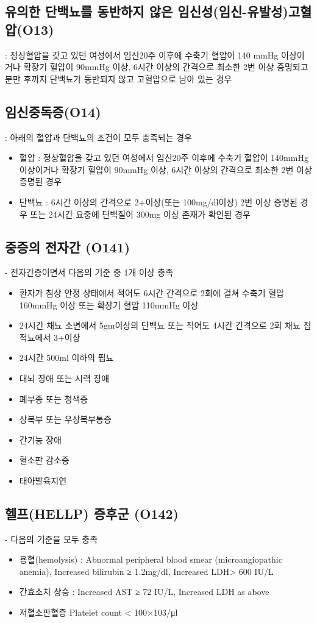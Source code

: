 \subsection{유의한 단백뇨를 동반하지 않은 임신성(임신-유발성)고혈압(O13)}\label{SUPPIH}
 : 정상혈압을 갖고 있던 여성에서 임신20주 이후에 수축기 혈압이 140 mmHg 이상이거나 확장기 혈압이 90mmHg 이상, 6시간 이상의 간격으로 최소한 2번 이상 증명되고 분만 후까지 단백뇨가 동반되지 않고 고혈압으로 남아 있는 경우

\subsection*{임신중독증(O14)}\label{PIH}
 : 아래의 혈압과 단백뇨의 조건이 모두 충족되는 경우
\begin{itemize}\tightlist
\item 혈압 : 정상혈압을 갖고 있던 여성에서 임신20주 이후에 수축기 혈압이 140mmHg 이상이거나 확장기 혈압이 90mmHg 이상, 6시간 이상의 간격으로 최소한 2번 이상 증명된 경우
\item 단백뇨 : 6시간 이상의 간격으로 2+이상(또는 100mg/dl이상) 2번 이상 증명된 경우 또는 24시간 요중에 단백질이 300mg 이상 존재가 확인된 경우
\end{itemize}

\subsection*{중증의 전자간 (O141)}\label{severePIH}
 - 전자간증이면서 다음의 기준 중 1개 이상 충족
\begin{itemize}\tightlist
\item 환자가 침상 안정 상태에서 적어도 6시간 간격으로 2회에 걸쳐 수축기 혈압 160mmHg 이상 또는 확장기 혈압 110mmHg 이상
\item 24시간 채뇨 소변에서 5gm이상의 단백뇨 또는 적어도 4시간 간격으로 2회 채뇨 점적뇨에서 3+이상
\item 24시간 500ml 이하의 핍뇨
\item 대뇌 장애 또는 시력 장애
\item 폐부종 또는 청색증
\item 상복부 또는 우상복부통증
\item 간기능 장애
\item 혈소판 감소증
\item 태아발육지연
\end{itemize}

\subsection*{헬프(HELLP) 증후군 (O142)}\label{HELLP}
 - 다음의 기준을 모두 충족
\begin{itemize}\tightlist
\item 용혈(hemolysis) : Abnormal peripheral blood smear (microangiopathic anemia), Increased bilirubin ≥ 1.2mg/dl, Increased LDH> 600 IU/L
\item 간효소치 상승 : Increased AST ≥ 72 IU/L, Increased LDH as above
\item 저혈소판혈증 Platelet count < 100×103/μl
\end{itemize}

